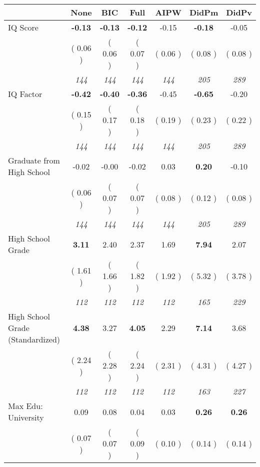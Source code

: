 \begin{tabular}{l c c c c c c}
\toprule
 & None & BIC & Full & AIPW & DidPm & DidPv \\
\midrule
IQ Score & \textbf{     -0.13 } & \textbf{     -0.13 } & \textbf{     -0.12 } &     -0.15 & \textbf{     -0.18 } &     -0.05 \\
& (     0.06 ) & (     0.06 ) & (     0.07 ) & (     0.06 ) & (     0.08 ) & (     0.08 ) \\
& \textit{ 144 } & \textit{ 144 } & \textit{ 144 } & \textit{ 144 } & \textit{ 205 } & \textit{ 289 } \\
IQ Factor & \textbf{     -0.42 } & \textbf{     -0.40 } & \textbf{     -0.36 } &     -0.45 & \textbf{     -0.65 } &     -0.20 \\
& (     0.15 ) & (     0.17 ) & (     0.18 ) & (     0.19 ) & (     0.23 ) & (     0.22 ) \\
& \textit{ 144 } & \textit{ 144 } & \textit{ 144 } & \textit{ 144 } & \textit{ 205 } & \textit{ 289 } \\
Graduate from High School &     -0.02 &     -0.00 &     -0.02 &      0.03 & \textbf{      0.20 } &     -0.10 \\
& (     0.06 ) & (     0.07 ) & (     0.07 ) & (     0.08 ) & (     0.12 ) & (     0.08 ) \\
& \textit{ 144 } & \textit{ 144 } & \textit{ 144 } & \textit{ 144 } & \textit{ 205 } & \textit{ 289 } \\
High School Grade & \textbf{      3.11 } &      2.40 &      2.37 &      1.69 & \textbf{      7.94 } &      2.07 \\
& (     1.61 ) & (     1.66 ) & (     1.82 ) & (     1.92 ) & (     5.32 ) & (     3.78 ) \\
& \textit{ 112 } & \textit{ 112 } & \textit{ 112 } & \textit{ 112 } & \textit{ 165 } & \textit{ 229 } \\
High School Grade (Standardized) & \textbf{      4.38 } &      3.27 & \textbf{      4.05 } &      2.29 & \textbf{      7.14 } &      3.68 \\
& (     2.24 ) & (     2.28 ) & (     2.24 ) & (     2.31 ) & (     4.31 ) & (     4.27 ) \\
& \textit{ 112 } & \textit{ 112 } & \textit{ 112 } & \textit{ 112 } & \textit{ 163 } & \textit{ 227 } \\
Max Edu: University &      0.09 &      0.08 &      0.04 &      0.03 & \textbf{      0.26 } & \textbf{      0.26 } \\
& (     0.07 ) & (     0.07 ) & (     0.09 ) & (     0.10 ) & (     0.14 ) & (     0.14 ) \\

\end{tabular}
